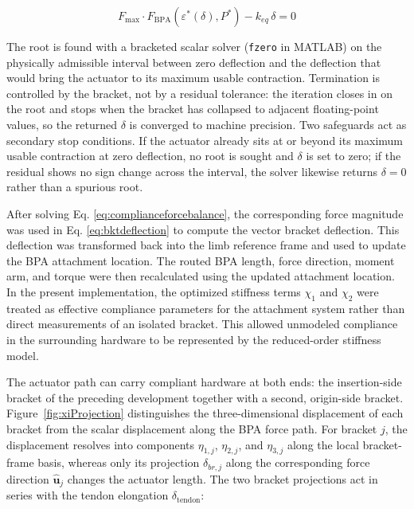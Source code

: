 \begin{equation} F_{\mathrm{max}} \cdot F_{\mathrm{BPA}}\!\left(\varepsilon^*(\delta),P^*\right) - k_{eq}\,\delta = 0
\label{eq:complianceforcebalance}
\end{equation}

The root is found with a bracketed scalar solver (\texttt{fzero} in MATLAB) on the physically admissible interval between zero deflection and the deflection that would bring the actuator to its maximum usable contraction. Termination is controlled by the bracket, not by a residual tolerance: the iteration closes in on the root and stops when the bracket has collapsed to adjacent floating-point values, so the returned $\delta$ is converged to machine precision. Two safeguards act as secondary stop conditions. If the actuator already sits at or beyond its maximum usable contraction at zero deflection, no root is sought and $\delta$ is set to zero; if the residual shows no sign change across the interval, the solver likewise returns $\delta = 0$ rather than a spurious root.

After solving Eq. \ref{eq:complianceforcebalance}, the corresponding force magnitude was used in Eq. \ref{eq:bktdeflection} to compute the vector bracket deflection. This deflection was transformed back into the limb reference frame and used to update the BPA attachment location. The routed BPA length, force direction, moment arm, and torque were then recalculated using the updated attachment location. In the present implementation, the optimized stiffness terms $\chi_{1}$ and $\chi_{2}$ were treated as effective compliance parameters for the attachment system rather than direct measurements of an isolated bracket. This allowed unmodeled compliance in the surrounding hardware to be represented by the reduced-order stiffness model.

The actuator path can carry compliant hardware at both ends: the insertion-side bracket of the preceding development together with a second, origin-side bracket. Figure~\ref{fig:xiProjection} distinguishes the three-dimensional displacement of each bracket from the scalar displacement along the BPA force path. For bracket $j$, the displacement resolves into components $\eta_{1,j}$, $\eta_{2,j}$, and $\eta_{3,j}$ along the local bracket-frame basis, whereas only its projection $\delta_{br,j}$ along the corresponding force direction $\hat{\mathbf{u}}_j$ changes the actuator length. The two bracket projections act in series with the tendon elongation $\delta_{\mathrm{tendon}}$:

